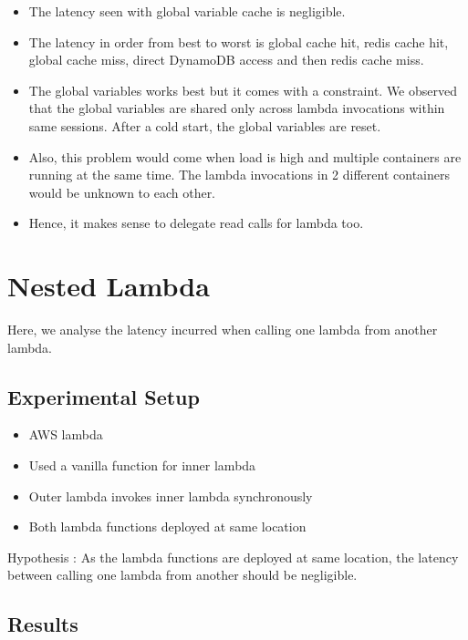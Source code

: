 \begin{itemize}
    \item The latency seen with global variable cache is negligible.
    \item The latency in order from best to worst is global cache hit, redis cache hit, global cache miss, direct DynamoDB access and then redis cache miss.
    \item The global variables works best but it comes with a constraint. We observed that the global variables are shared only across lambda invocations within same sessions. After a cold start, the global variables are reset.
    \item Also, this problem would come when load is high and multiple containers are running at the same time. The lambda invocations in 2 different containers would be unknown to each other.
    \item Hence, it makes sense to delegate read calls for lambda too.
\end{itemize}

\section{Nested Lambda}

Here, we analyse the latency incurred when calling one lambda from another lambda.

\subsection{Experimental Setup}
\begin{itemize}
    \item AWS lambda
    \item Used a vanilla function for inner lambda
    \item Outer lambda invokes inner lambda synchronously
    \item Both lambda functions deployed at same location
\end{itemize}

Hypothesis : As the lambda functions are deployed at same location, the latency between calling one lambda from another should be negligible.

\subsection{Results}

